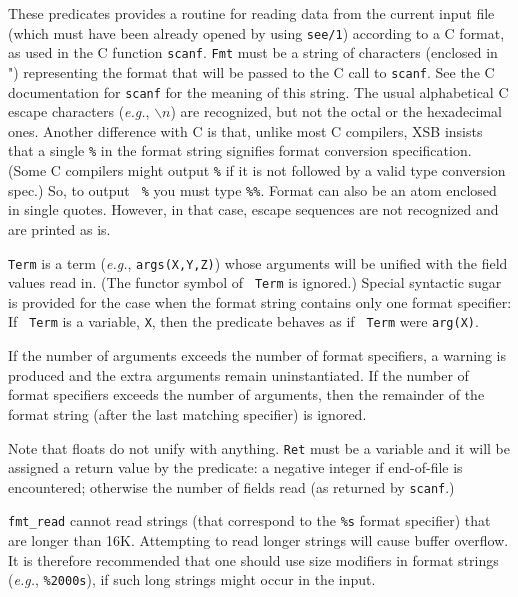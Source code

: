 \begin{description}
\vspace{-7mm}
%
    These predicates provides a routine for reading data from the
    current input file (which must have been already opened by using
    {\tt see/1}) according to a C format, as used in the C function
    {\tt scanf}. {\tt Fmt} must be a string of characters (enclosed in
    ") representing the format that will be passed to the C call to
    {\tt scanf}.  See the C documentation for {\tt scanf} for the
    meaning of this string.  The usual alphabetical C escape
    characters ({\it e.g.}, $\backslash n$) are recognized, but not
    the octal or the hexadecimal ones.  Another difference with C is
    that, unlike most C compilers, XSB insists that a single {\tt \%}
    in the format string signifies format conversion
    specification. (Some C compilers might output {\tt \%} if it is
    not followed by a valid type conversion spec.) So, to output {\tt
    \%} you must type {\tt \%\%}.  Format can also be an atom enclosed
    in single quotes. However, in that case, escape sequences are not
    recognized and are printed as is.

    {\tt Term} is a term ({\it e.g.}, {\tt args(X,Y,Z)})  whose arguments
    will be unified with the field values read in.  (The functor symbol of {\tt
    Term} is ignored.)  Special syntactic sugar is provided for the case
    when the format string contains only one format specifier: If {\tt
    Term} is a variable, {\tt X}, then the predicate behaves as if {\tt
    Term} were {\tt arg(X)}.

  If the number of arguments exceeds the number of format specifiers, a
  warning is produced and the extra arguments remain uninstantiated.
  If the number of format specifiers exceeds the number of arguments, then
  the remainder of the format string (after the last matching specifier) is
  ignored.
  
  Note that floats do not unify with anything.  {\tt Ret} must be a
  variable and it will be assigned a return value by the predicate: a
  negative integer if end-of-file is encountered; otherwise the number of
  fields read (as returned by {\tt scanf}.)
  
  {\tt fmt\_read} cannot read strings (that correspond to the {\tt \%s}
  format specifier) that are longer than 16K. Attempting to read longer
  strings will cause buffer overflow. It is therefore recommended that one
  should use size modifiers in format strings ({\it e.g.}, {\tt \%2000s}),
  if such long strings might occur in the input.


\end{description}
